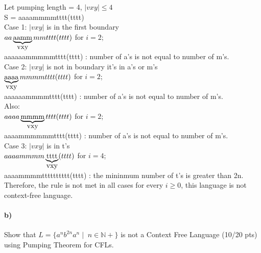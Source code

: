 \documentclass[a4paper,12pt]{article}
\begin{document}
\begin{tcolorbox}
Let pumping length = 4, $|vxy| \le 4 $\\
S = aaaammmmtttt(tttt)\\

Case 1: $|vxy|$ is in the first boundary\\
$aa\underbrace{\hbox{aamm}}_{\hbox{vxy}}mmtttt(tttt)$ for $i=2$; \\
aaaaaammmmmtttt(tttt) : number of a's is not equal to number of m's.\\

Case 2: $|vxy|$ is not in boundary it's in a's or m's \\
$\underbrace{\hbox{aaaa}}_{\hbox{vxy}}mmmmtttt(tttt)$ for $i=2$; \\
aaaaaammmmtttt(tttt) : number of a's is not equal to number of m's.\\
Also:\\
$aaaa\underbrace{\hbox{mmmm}}_{\hbox{vxy}}tttt(tttt)$ for $i=2$; \\
aaaammmmmmtttt(tttt) : number of a's is not equal to number of m's.\\

Case 3: $|vxy|$ is in t's\\
$aaaammmm\underbrace{\hbox{tttt}}_{\hbox{vxy}}(tttt)$ for $i=4$; \\
aaaammmmtttttttttt(tttt) : the mininmum number of t's is greater than 2n.\\

Therefore, the rule is not met in all cases for every $i \ge 0$, this language is not context-free language. 
\end{tcolorbox}


\paragraph{b)} Show that $L=\{a^n b^{2n} a^n \mid \; n \in \mathbb{N+} \}$ is not a Context Free Language \hfill \small{(10/20 pts)} \\
using Pumping Theorem for CFLs. \\
\end{document}
